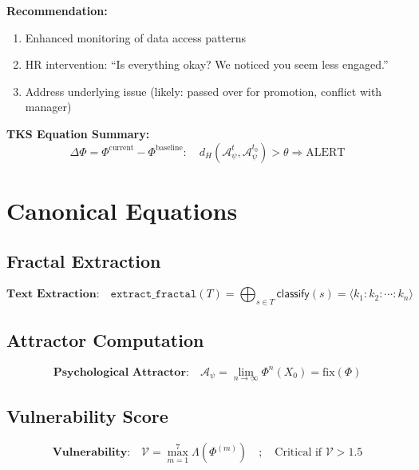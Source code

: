 \documentclass[11pt,twoside]{book}
\theoremstyle{definition}
\theoremstyle{plain}
\theoremstyle{remark}
\newcommand{\Frac}{\Phi}
\newcommand{\PsychAttractor}{\mathcal{A}_\psi}
\newcommand{\Lacunarity}{\Lambda}
\newcommand{\fix}{\mathrm{fix}}
\newcommand{\VulnScore}{\mathcal{V}}
\begin{document}
\begin{tcolorbox}[colback=yellow!5!white,colframe=yellow!65!black,title=\textbf{Scenario: Insider Threat Detection via Fractal Anomaly},breakable]
\textbf{Recommendation:}
\begin{enumerate}
    \item Enhanced monitoring of data access patterns
    \item HR intervention: ``Is everything okay? We noticed you seem less engaged.''
    \item Address underlying issue (likely: passed over for promotion, conflict with manager)
\end{enumerate}

\textbf{TKS Equation Summary:}
\begin{equation}
\boxed{
    \Delta \Frac = \Frac^{\mathrm{current}} - \Frac^{\mathrm{baseline}} : \quad
    d_H(\PsychAttractor^{t}, \PsychAttractor^{t_0}) > \theta \Rightarrow \text{ALERT}
}
\end{equation}

\end{tcolorbox}

\chapter{Canonical Equations}

\section{Fractal Extraction}

\begin{equation}
\boxed{
    \textbf{Text Extraction:} \quad
    \mathtt{extract\_fractal}(T) = \bigoplus_{s \in T} \mathsf{classify}(s)
    = \langle k_1 : k_2 : \cdots : k_n \rangle
}
\label{eq:psych-extract}
\end{equation}

\section{Attractor Computation}

\begin{equation}
\boxed{
    \textbf{Psychological Attractor:} \quad
    \PsychAttractor = \lim_{n \to \infty} \Frac^n(X_0) = \fix(\Frac)
}
\label{eq:psych-attractor}
\end{equation}

\section{Vulnerability Score}

\begin{equation}
\boxed{
    \textbf{Vulnerability:} \quad
    \VulnScore = \max_{m=1}^{7} \Lacunarity(\Frac^{(m)})
    \quad ; \quad \text{Critical if } \VulnScore > 1.5
}
\label{eq:psych-vuln}
\end{equation}
\end{document}
